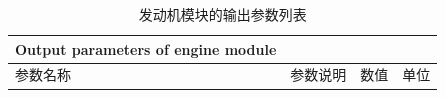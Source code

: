 \documentclass[12pt,a4paper]{report}
\begin{document}

\begin{center}
\begin{longtable}{|p{5.8cm}|p{3.9cm}|p{1.9cm}|p{1.4cm}|}
\caption{发动机模块的输出参数列表}{Output parameters of engine module}
\label{tab:engineoutput} \\ \hline \hline
\multicolumn{1}{|l|}{参数名称} & \multicolumn{1}{l|}{参数说明} & \multicolumn{1}{l|}{数值}  & \multicolumn{1}{l|}{单位} \\ \hline 
\endfirsthead


\end{longtable}
\end{center}
\end{document}
